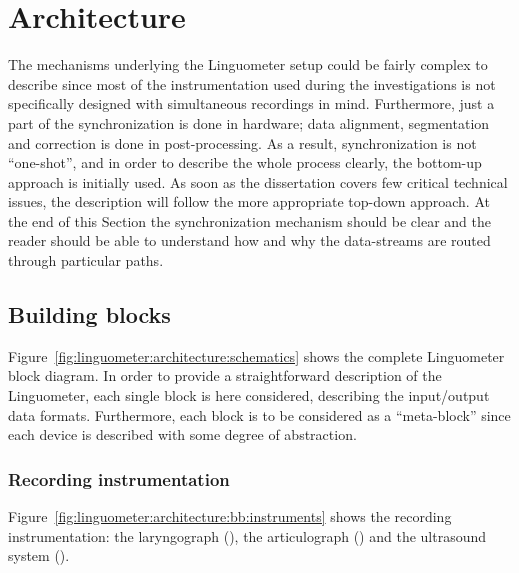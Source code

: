 \section{Architecture}
\label{ch:linguometer:architecture}
The mechanisms underlying the Linguometer setup could be fairly complex to
describe since most of the instrumentation used during the investigations is
not specifically designed with simultaneous recordings in mind.
Furthermore, just a part of the synchronization is done in hardware; 
data alignment, segmentation and correction is done in post-processing.
As a result, synchronization is not ``one-shot'', and in order to describe the
whole process clearly, the bottom-up approach is initially used.
As soon as the dissertation covers few critical technical issues, the
description will follow the more appropriate top-down approach.
At the end of this Section the synchronization mechanism should be clear and 
the reader should be able to understand how and why the data-streams are routed
through particular paths. 
\subsection{Building blocks}
\label{sec:linguometer:architecture:blocks}
Figure~\ref{fig:linguometer:architecture:schematics} shows the complete
Linguometer block diagram.
In order to provide a straightforward description of the Linguometer, each
single block is here considered, describing the input/output data formats.
Furthermore, each block is to be considered as a ``meta-block'' since each
device is described with some degree of abstraction.
\subsubsection{Recording instrumentation}

Figure~\ref{fig:linguometer:architecture:bb:instruments} shows the recording
instrumentation: the laryngograph (), the articulograph () and
the ultrasound system ().


